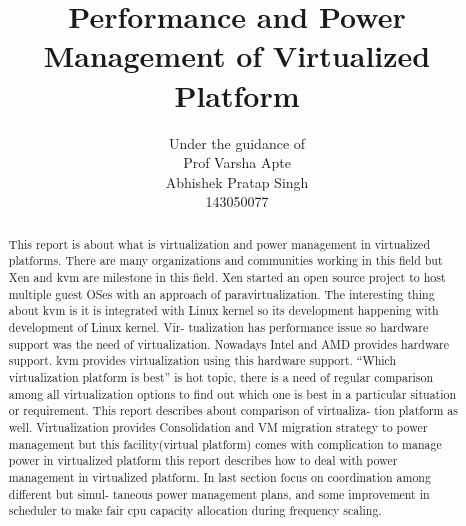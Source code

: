 \documentclass[seminar,twoside]{iitbreport}
\begin{document}
\title{Performance and Power Management of Virtualized Platform}
\author{
{Under the guidance of\\
Prof Varsha Apte}\\ \vfill Abhishek Pratap Singh \\ 143050077\\}


\maketitle

\begin{abstract}
This report is about what is virtualization and power management in virtualized platforms.
There are many organizations and communities working in this field but Xen and kvm are
milestone in this field. Xen started an open source project to host multiple guest OSes
with an approach of paravirtualization. The interesting thing about kvm is it is integrated
with Linux kernel so its development happening with development of Linux kernel. Vir-
tualization has performance issue so hardware support was the need of virtualization.
Nowadays Intel and AMD provides hardware support. kvm provides virtualization using
this hardware support. “Which virtualization platform is best” is hot topic, there is a need
of regular comparison among all virtualization options to find out which one is best in a
particular situation or requirement. This report describes about comparison of virtualiza-
tion platform as well. Virtualization provides Consolidation and VM migration strategy to
power management but this facility(virtual platform) comes with complication to manage
power in virtualized platform this report describes how to deal with power management
in virtualized platform. In last section focus on coordination among different but simul-
taneous power management plans, and some improvement in scheduler to make fair cpu
capacity allocation during frequency scaling.
\end{abstract}

\tableofcontents

\setcounter{page}{1}
\renewcommand{\thesection}{\arabic{section}}
\begingroup
\let\cleardoublepage\clearpage

\setcounter{page}{1}
\end{document}

